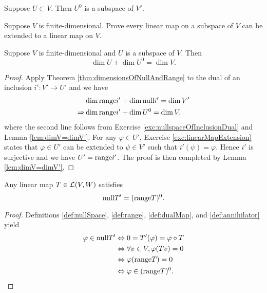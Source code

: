 \begin{lem}
  \label{lem:annihilatorSubspace}
  Suppose $U\subset V$.
  Then $U^0$ is a subspace of $V'$.
\end{lem}

\begin{exc}
  \label{exc:linearMapExtension}
  Suppose $V$ is finite-dimensional.
  Prove every linear map on a subspace of $V$
   can be extended to a linear map on $V$.
\end{exc}

\begin{lem}
  \label{lem:dimAnnihilator}
  Suppose $V$ is finite-dimensional and $U$
  is a subspace of $V$.
  Then 
  \begin{equation}
    \label{eq:dimAnnihilator}
    \dim U + \dim U^0 = \dim V.
  \end{equation}
\end{lem}
\begin{proof}
  Apply Theorem \ref{thm:dimensionsOfNullAndRange}
   to the dual of an inclusion \mbox{$i': V'\rightarrow U'$}
   and we have
   \begin{align*}
     &\dim \mathrm{range} i' + \dim \mathrm{null} i' = \dim V'
       \\
     \Rightarrow & 
      \dim \mathrm{range} i' + \dim U^0 = \dim V,
   \end{align*}
   where the second line follows from
    Exercise \ref{exc:nullspaceOfInclusionDual}
    and Lemma \ref{lem:dimV=dimV'}.
   For any $\varphi\in U'$,
    Exercise \ref{exc:linearMapExtension} states that
    $\varphi\in U'$ can be extended to $\psi\in V'$
    such that $i'(\psi)= \varphi$.
   Hence $i'$ is surjective
    and we have $U'=\mathrm{range} i'$.
   The proof is then completed by 
    Lemma \ref{lem:dimV=dimV'}.
\end{proof}

\begin{lem}
  \label{lem:nullSpaceOfDualMap}
  Any linear map $T\in {\cal L}(V, W)$
  satisfies
  \begin{equation}
    \label{eq:nullSpaceOfDualMap}
    \mathrm{null} T' = (\mathrm{range} T)^0.
  \end{equation}
\end{lem}
\begin{proof}
  Definitions \ref{def:nullSpace}, \ref{def:range},
   \ref{def:dualMap}, and \ref{def:annihilator}
   yield
  \begin{align*}
    \varphi\in \mathrm{null} T' 
    &\Leftrightarrow 0= T'(\varphi) = \varphi\circ T
    \\
    &\Leftrightarrow \forall v\in V, \varphi(Tv) = 0
    \\
    &\Leftrightarrow \varphi(\mathrm{range} T) = 0
    \\
    &\Leftrightarrow \varphi\in (\mathrm{range} T)^0.
      \qedhere
  \end{align*}
\end{proof}

